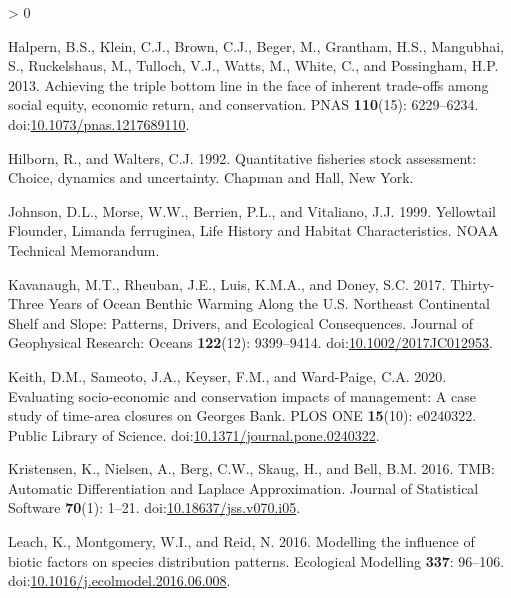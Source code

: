 \documentclass[
]{article}
\newlength{\cslhangindent}
\newenvironment{CSLReferences}[2] %
 {%
  \setlength{\parindent}{0pt}
  \ifodd #1 \everypar{\setlength{\hangindent}{\cslhangindent}}\ignorespaces\fi
  \ifnum #2 > 0
  \setlength{\parskip}{#2\baselineskip}
  \fi
 }%
 {}
\begin{document}
\begin{CSLReferences}{1}{0}
\leavevmode\hypertarget{ref-halpernAchievingTripleBottom2013}{}%
Halpern, B.S., Klein, C.J., Brown, C.J., Beger, M., Grantham, H.S., Mangubhai, S., Ruckelshaus, M., Tulloch, V.J., Watts, M., White, C., and Possingham, H.P. 2013. Achieving the triple bottom line in the face of inherent trade-offs among social equity, economic return, and conservation. PNAS \textbf{110}(15): 6229--6234. doi:\href{https://doi.org/10.1073/pnas.1217689110}{10.1073/pnas.1217689110}.

\leavevmode\hypertarget{ref-hilbornQuantitativeFisheriesStock1992}{}%
Hilborn, R., and Walters, C.J. 1992. Quantitative fisheries stock assessment: Choice, dynamics and uncertainty. {Chapman and Hall}, {New York}.

\leavevmode\hypertarget{ref-johnsonYellowtailFlounderLimanda1999}{}%
Johnson, D.L., Morse, W.W., Berrien, P.L., and Vitaliano, J.J. 1999. Yellowtail {Flounder}, {Limanda} ferruginea, {Life History} and {Habitat Characteristics}. NOAA Technical Memorandum.

\leavevmode\hypertarget{ref-kavanaughThirtyThreeYearsOcean2017}{}%
Kavanaugh, M.T., Rheuban, J.E., Luis, K.M.A., and Doney, S.C. 2017. Thirty-{Three Years} of {Ocean Benthic Warming Along} the {U}.{S}. {Northeast Continental Shelf} and {Slope}: {Patterns}, {Drivers}, and {Ecological Consequences}. Journal of Geophysical Research: Oceans \textbf{122}(12): 9399--9414. doi:\href{https://doi.org/10.1002/2017JC012953}{10.1002/2017JC012953}.

\leavevmode\hypertarget{ref-keithEvaluatingSocioeconomicConservation2020}{}%
Keith, D.M., Sameoto, J.A., Keyser, F.M., and Ward-Paige, C.A. 2020. Evaluating socio-economic and conservation impacts of management: {A} case study of time-area closures on {Georges Bank}. PLOS ONE \textbf{15}(10): e0240322. {Public Library of Science}. doi:\href{https://doi.org/10.1371/journal.pone.0240322}{10.1371/journal.pone.0240322}.

\leavevmode\hypertarget{ref-kristensenTMBAutomaticDifferentiation2016}{}%
Kristensen, K., Nielsen, A., Berg, C.W., Skaug, H., and Bell, B.M. 2016. {TMB}: {Automatic Differentiation} and {Laplace Approximation}. Journal of Statistical Software \textbf{70}(1): 1--21. doi:\href{https://doi.org/10.18637/jss.v070.i05}{10.18637/jss.v070.i05}.

\leavevmode\hypertarget{ref-leachModellingInfluenceBiotic2016}{}%
Leach, K., Montgomery, W.I., and Reid, N. 2016. Modelling the influence of biotic factors on species distribution patterns. Ecological Modelling \textbf{337}: 96--106. doi:\href{https://doi.org/10.1016/j.ecolmodel.2016.06.008}{10.1016/j.ecolmodel.2016.06.008}.


\end{CSLReferences}
\end{document}
